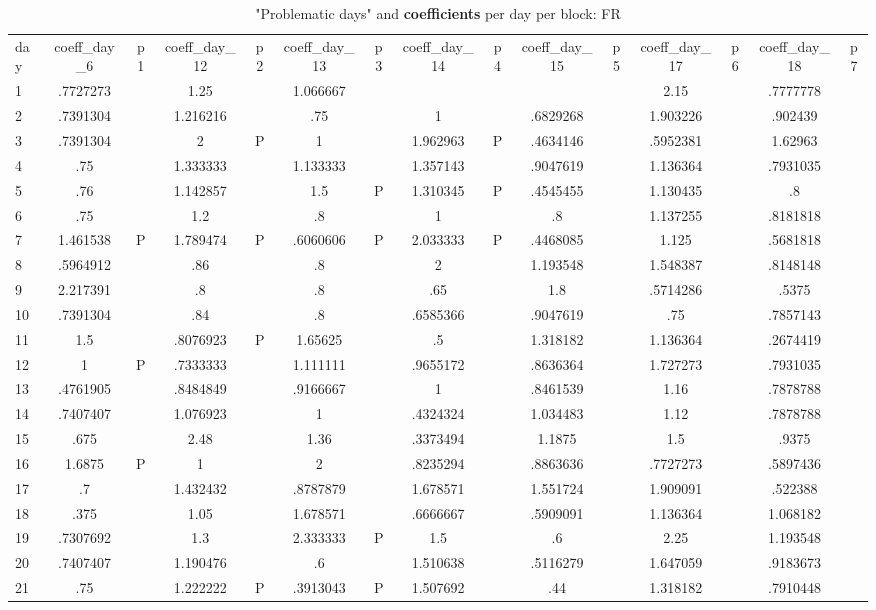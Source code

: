 \documentclass[a4paper,12pt]{article}
\begin{document}
\begin{landscape}
\begin{footnotesize}
\begin{center}
\begin{longtable}{l|cc|cc|cc|cc|cc|cc|cc|}
\caption{"Problematic days" and \textbf{coefficients} per day per block: FR\label{tab_fr_4}}
\hline
day&coeff\_day\_6&p1&coeff\_day\_12&p2&coeff\_day\_13&p3&coeff\_day\_14&p4&coeff\_day\_15&p5&coeff\_day\_17&p6&coeff\_day\_18&p7 \\
1&.7727273&&1.25&&1.066667&&&&&&2.15&&.7777778& \\
2&.7391304&&1.216216&&.75&&1&&.6829268&&1.903226&&.902439& \\
3&.7391304&&2&P&1&&1.962963&P&.4634146&&.5952381&&1.62963& \\
4&.75&&1.333333&&1.133333&&1.357143&&.9047619&&1.136364&&.7931035& \\
5&.76&&1.142857&&1.5&P&1.310345&P&.4545455&&1.130435&&.8& \\
6&.75&&1.2&&.8&&1&&.8&&1.137255&&.8181818& \\
7&1.461538&P&1.789474&P&.6060606&P&2.033333&P&.4468085&&1.125&&.5681818& \\
8&.5964912&&.86&&.8&&2&&1.193548&&1.548387&&.8148148& \\
9&2.217391&&.8&&.8&&.65&&1.8&&.5714286&&.5375& \\
10&.7391304&&.84&&.8&&.6585366&&.9047619&&.75&&.7857143& \\
11&1.5&&.8076923&P&1.65625&&.5&&1.318182&&1.136364&&.2674419& \\
12&1&P&.7333333&&1.111111&&.9655172&&.8636364&&1.727273&&.7931035& \\
13&.4761905&&.8484849&&.9166667&&1&&.8461539&&1.16&&.7878788& \\
14&.7407407&&1.076923&&1&&.4324324&&1.034483&&1.12&&.7878788& \\
15&.675&&2.48&&1.36&&.3373494&&1.1875&&1.5&&.9375& \\
16&1.6875&P&1&&2&&.8235294&&.8863636&&.7727273&&.5897436& \\
17&.7&&1.432432&&.8787879&&1.678571&&1.551724&&1.909091&&.522388& \\
18&.375&&1.05&&1.678571&&.6666667&&.5909091&&1.136364&&1.068182& \\
19&.7307692&&1.3&&2.333333&P&1.5&&.6&&2.25&&1.193548& \\
20&.7407407&&1.190476&&.6&&1.510638&&.5116279&&1.647059&&.9183673& \\
21&.75&&1.222222&P&.3913043&P&1.507692&&.44&&1.318182&&.7910448& \\

\end{longtable}
\end{center}
\end{footnotesize}
\end{landscape}
\end{document}
